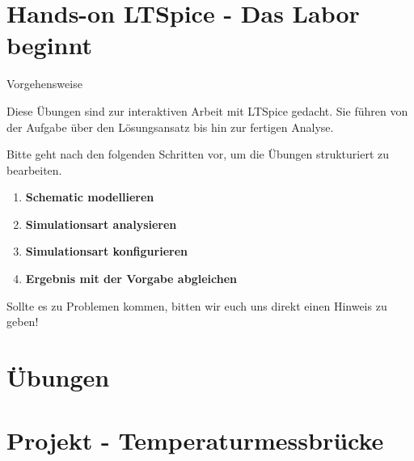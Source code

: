 \documentclass{beamer}
\begin{document}
\section{Hands-on LTSpice - Das Labor beginnt}
  
  
\begin{frame}[fragile]{Vorgehensweise}

  Diese Übungen sind zur interaktiven Arbeit mit LTSpice gedacht. 
  Sie führen von der Aufgabe über den Lösungsansatz bis hin zur fertigen Analyse.
  
  Bitte geht nach den folgenden Schritten vor, um die Übungen strukturiert zu bearbeiten. 
  
  \begin{enumerate}
\item \textbf{Schematic modellieren}
\item \textbf{Simulationsart analysieren}
\item \textbf{Simulationsart konfigurieren}
\item \textbf{Ergebnis mit der Vorgabe abgleichen}
\end{enumerate}

Sollte es zu Problemen kommen, bitten wir euch uns direkt einen Hinweis zu geben!

  \end{frame}
  
  \section{Übungen}
  
  
\section{Projekt - Temperaturmessbrücke}

\end{document}
